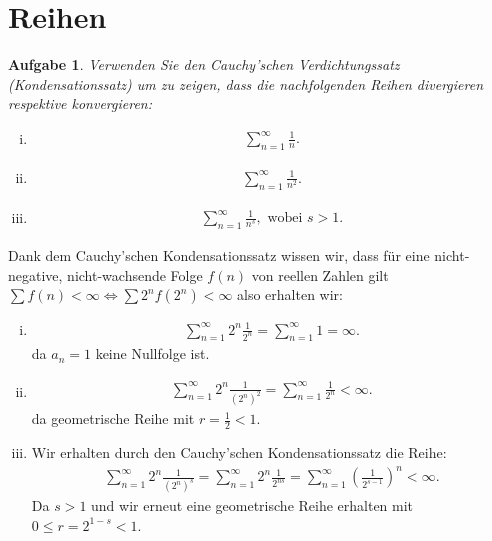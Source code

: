 \documentclass[a4paper, 20]{exam}
\newtheorem{ex}{Aufgabe}
\begin{document}
\newpage
\section{Reihen}


\begin{ex} Verwenden Sie den Cauchy'schen Verdichtungssatz (Kondensationssatz) um zu zeigen, dass die nachfolgenden Reihen divergieren respektive konvergieren:
\begin{enumerate}[i)]
\item \begin{align*}
\sum_{n=1}^\infty \frac{1}{n}.
\end{align*}
\item \begin{align*}
\sum_{n=1}^\infty \frac{1}{n^2}.
\end{align*}

\item 
\begin{align*}
 \sum_{n=1}^\infty \frac{1}{n^s}, \text{ wobei } s >1. 
\end{align*}

\end{enumerate}

\end{ex}


\begin{solution} Dank dem Cauchy'schen Kondensationssatz wissen wir, dass für eine nicht-negative, nicht-wachsende Folge $f(n)$ von reellen Zahlen gilt $\sum f(n) < \infty \iff \sum 2^n f(2^n) <\infty$ also erhalten wir:
\begin{enumerate}[i)]
\item 
\begin{align*}
\sum_{n=1}^\infty 2^n \frac{1}{2^n} = \sum_{n=1}^\infty 1 = \infty.
\end{align*}
da $a_n=1$ keine Nullfolge ist.
\item 
\begin{align*}
\sum_{n=1}^\infty 2^n \frac{1}{(2^n)^2 } = \sum_{n=1}^\infty \frac{1}{2^n}< \infty.
\end{align*}
da geometrische Reihe mit $r= \frac{1}{2}<1$. 

\item Wir erhalten durch den Cauchy'schen Kondensationssatz die Reihe:
\begin{align*}
 \sum_{n=1}^\infty 2^n \frac{1}{(2^n)^s} = \sum_{n=1}^\infty 2^n \frac{1}{2^{ns}} = \sum_{n=1}^\infty \left(\frac{1}{2^{s-1}}\right)^n < \infty.
\end{align*}
Da $s>1$ und wir erneut eine geometrische Reihe erhalten mit $0 \leq r = 2^{1-s} <1$. 
\end{enumerate}

\end{solution}
\end{document}
